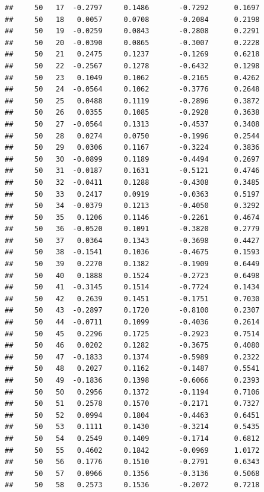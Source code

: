 \documentclass[
]{article}
\begin{document}
\begin{verbatim}
##     50   17  -0.2797     0.1486       -0.7292      0.1697  
##     50   18   0.0057     0.0708       -0.2084      0.2198  
##     50   19  -0.0259     0.0843       -0.2808      0.2291  
##     50   20  -0.0390     0.0865       -0.3007      0.2228  
##     50   21   0.2475     0.1237       -0.1269      0.6218  
##     50   22  -0.2567     0.1278       -0.6432      0.1298  
##     50   23   0.1049     0.1062       -0.2165      0.4262  
##     50   24  -0.0564     0.1062       -0.3776      0.2648  
##     50   25   0.0488     0.1119       -0.2896      0.3872  
##     50   26   0.0355     0.1085       -0.2928      0.3638  
##     50   27  -0.0564     0.1313       -0.4537      0.3408  
##     50   28   0.0274     0.0750       -0.1996      0.2544  
##     50   29   0.0306     0.1167       -0.3224      0.3836  
##     50   30  -0.0899     0.1189       -0.4494      0.2697  
##     50   31  -0.0187     0.1631       -0.5121      0.4746  
##     50   32  -0.0411     0.1288       -0.4308      0.3485  
##     50   33   0.2417     0.0919       -0.0363      0.5197  
##     50   34  -0.0379     0.1213       -0.4050      0.3292  
##     50   35   0.1206     0.1146       -0.2261      0.4674  
##     50   36  -0.0520     0.1091       -0.3820      0.2779  
##     50   37   0.0364     0.1343       -0.3698      0.4427  
##     50   38  -0.1541     0.1036       -0.4675      0.1593  
##     50   39   0.2270     0.1382       -0.1909      0.6449  
##     50   40   0.1888     0.1524       -0.2723      0.6498  
##     50   41  -0.3145     0.1514       -0.7724      0.1434  
##     50   42   0.2639     0.1451       -0.1751      0.7030  
##     50   43  -0.2897     0.1720       -0.8100      0.2307  
##     50   44  -0.0711     0.1099       -0.4036      0.2614  
##     50   45   0.2296     0.1725       -0.2923      0.7514  
##     50   46   0.0202     0.1282       -0.3675      0.4080  
##     50   47  -0.1833     0.1374       -0.5989      0.2322  
##     50   48   0.2027     0.1162       -0.1487      0.5541  
##     50   49  -0.1836     0.1398       -0.6066      0.2393  
##     50   50   0.2956     0.1372       -0.1194      0.7106  
##     50   51   0.2578     0.1570       -0.2171      0.7327  
##     50   52   0.0994     0.1804       -0.4463      0.6451  
##     50   53   0.1111     0.1430       -0.3214      0.5435  
##     50   54   0.2549     0.1409       -0.1714      0.6812  
##     50   55   0.4602     0.1842       -0.0969      1.0172  
##     50   56   0.1776     0.1510       -0.2791      0.6343  
##     50   57   0.0966     0.1356       -0.3136      0.5068  
##     50   58   0.2573     0.1536       -0.2072      0.7218  

\end{verbatim}
\end{document}
